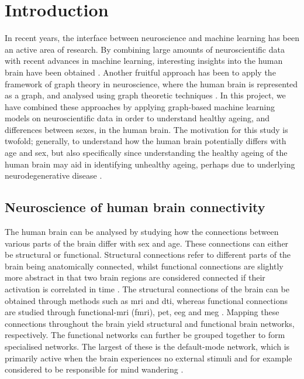 \chapter{Introduction}

In recent years, the interface between neuroscience and machine learning has been an active area of research. By combining large amounts of neuroscientific data with recent advances in machine learning, interesting insights into the human brain have been obtained \cite{neuro_ml, amoroso_multiplex_age, amoroso_multiplex_ad}. Another fruitful approach has been to apply the framework of graph theory in neuroscience, where the human brain is represented as a graph, and analysed using graph theoretic techniques \cite{chan, braph}. In this project, we have combined these approaches by applying graph-based machine learning models on neuroscientific data in order to understand healthy ageing, and differences between sexes, in the human brain. The motivation for this study is twofold; generally, to understand how the human brain potentially differs with age and sex, but also specifically since understanding the healthy ageing of the human brain may aid in identifying unhealthy ageing, perhaps due to underlying neurodegenerative disease \cite{kaufmann}. 

\section{Neuroscience of human brain connectivity}

The human brain can be analysed by studying how the connections between various parts of the brain differ with sex and age. These connections can either be structural or functional. Structural connections refer to different parts of the brain being anatomically connected, whilst functional connections are slightly more abstract in that two brain regions are considered connected if their activation is correlated in time \cite{sporns}. The structural connections of the brain can be obtained through methods such as \acrshort{mri} and \acrshort{dti}, whereas functional connections are studied through functional-\acrshort{mri} (\acrshort{fmri}), \acrshort{pet}, \acrshort{eeg} and \acrshort{meg} \cite{hirsch}. Mapping these connections throughout the brain yield structural and functional brain networks, respectively. The functional networks can further be grouped together to form specialised networks. The largest of these is the default-mode network, which is primarily active when the brain experiences no external stimuli and for example considered to be responsible for mind wandering \cite{alves_dmn}.

